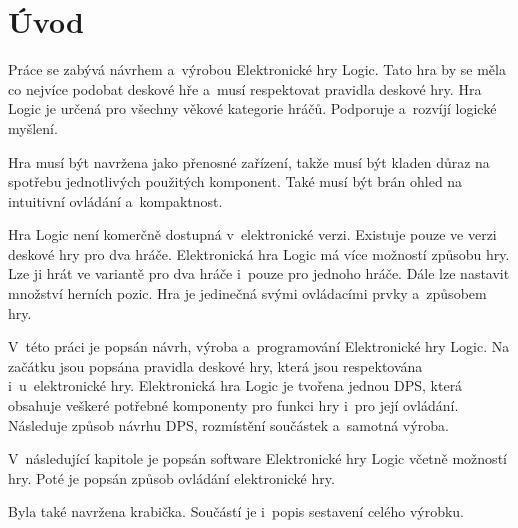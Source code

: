 \chapter*{Úvod}
{}

Práce se zabývá návrhem a~výrobou Elektronické hry Logic. Tato hra by se měla co nejvíce podobat deskové hře a~musí respektovat pravidla deskové 
hry. Hra Logic je určená pro všechny věkové kategorie hráčů. Podporuje a~rozvíjí logické myšlení. 

Hra musí být navržena jako přenosné zařízení, takže musí být kladen důraz na spotřebu jednotlivých použitých komponent. Také musí být brán ohled na 
intuitivní ovládání a~kompaktnost.

Hra Logic není komerčně dostupná v~elektronické verzi. Existuje pouze ve verzi deskové hry pro dva hráče. Elektronická hra Logic má více možností
způsobu hry. Lze ji hrát ve variantě pro dva hráče i~pouze pro jednoho hráče. Dále lze nastavit množství herních pozic. Hra je jedinečná svými ovládacími 
prvky a~způsobem hry. 

V~této práci je popsán návrh, výroba a~programování Elektronické hry Logic. Na začátku jsou popsána pravidla deskové hry, která jsou respektována i~u~elektronické hry. 
Elektronická hra Logic je tvořena jednou DPS, která obsahuje veškeré potřebné komponenty pro funkci hry i~pro její ovládání. Následuje způsob
návrhu DPS, rozmístění součástek a~samotná výroba.

V~následující kapitole je popsán software Elektronické hry Logic včetně možností hry. Poté je popsán způsob ovládání elektronické hry.

Byla také navržena krabička. Součástí je i~popis sestavení celého výrobku. 




